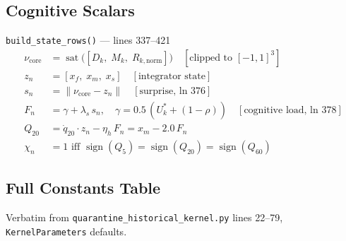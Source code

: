 \documentclass[11pt,a4paper]{article}
\newcommand{\code}[1]{\texttt{\small#1}}
\begin{document}
\subsection{Cognitive Scalars}

\code{build\_state\_rows()} — lines 337--421
\begin{align}
  \nu_{\text{core}} &= \operatorname{sat}\!\bigl([D_k,\;M_k,\;R_{k,\text{norm}}]\bigr) \quad [\text{clipped to }[-1,1]^3]\\
  z_n &= [x_f,\;x_m,\;x_s] \quad [\text{integrator state}]\\
  s_n &= \|\nu_{\text{core}} - z_n\| \quad [\text{surprise, ln 376}]\\
  F_n &= \gamma + \lambda_s\,s_n,\quad \gamma = 0.5\,(U^*_k + (1 - \rho))\quad [\text{cognitive load, ln 378}]\\
  Q_{20} &= \dot{q}_{20} \cdot z_n - \eta_h\,F_n = x_m - 2.0\,F_n\\
  \chi_n &= 1 \text{ iff } \operatorname{sign}(Q_5)=\operatorname{sign}(Q_{20})=\operatorname{sign}(Q_{60})
\end{align}

\subsection{Full Constants Table}

Verbatim from \texttt{quarantine\_historical\_kernel.py} lines 22--79, \texttt{KernelParameters} defaults.
\end{document}
